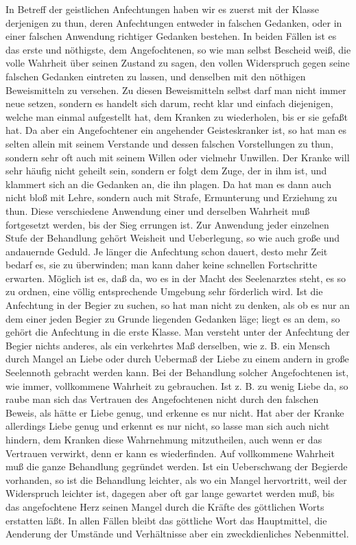 In Betreff der geistlichen Anfechtungen haben wir es zuerst mit der Klasse derjenigen zu thun, deren Anfechtungen entweder in falschen Gedanken, oder in einer falschen Anwendung richtiger Gedanken bestehen. In beiden Fällen ist es das erste und nöthigste, dem Angefochtenen, so wie man selbst Bescheid weiß, die volle Wahrheit über seinen Zustand zu sagen, den vollen Widerspruch gegen seine falschen Gedanken eintreten zu lassen, und denselben mit den nöthigen Beweismitteln zu versehen. Zu diesen Beweismitteln selbst darf man nicht immer neue setzen, sondern es handelt sich darum, recht klar und einfach diejenigen, welche man einmal aufgestellt hat, dem Kranken zu wiederholen, bis er sie gefaßt hat. Da
aber ein Angefochtener ein angehender Geisteskranker ist, so hat man es selten allein mit seinem Verstande und dessen falschen Vorstellungen zu thun, sondern sehr oft auch mit seinem Willen oder vielmehr Unwillen. Der Kranke will sehr häufig nicht geheilt sein, sondern er folgt dem Zuge, der in ihm ist, und klammert sich an die Gedanken an, die ihn plagen. Da hat man es dann auch nicht bloß mit Lehre, sondern auch mit Strafe, Ermunterung und Erziehung zu thun. Diese verschiedene Anwendung einer und derselben Wahrheit muß fortgesetzt werden, bis der Sieg errungen ist. Zur Anwendung jeder einzelnen Stufe der Behandlung gehört Weisheit und Ueberlegung, so wie auch große und andauernde Geduld. Je länger die Anfechtung schon dauert, desto mehr Zeit bedarf es, sie zu überwinden; man kann daher keine schnellen Fortschritte erwarten. Möglich ist es, daß da, wo es in der Macht des Seelenarztes steht, es so zu ordnen, eine völlig entsprechende Umgebung sehr förderlich wird. Ist die Anfechtung in der Begier zu suchen, so hat man nicht zu denken, als ob es nur an dem einer jeden Begier zu Grunde liegenden Gedanken läge; liegt es an dem, so gehört die Anfechtung in die erste Klasse. Man versteht unter der Anfechtung der Begier nichts anderes, als ein verkehrtes Maß derselben, wie z. B. ein Mensch durch Mangel an Liebe oder durch Uebermaß der Liebe zu einem andern in große Seelennoth gebracht werden kann. Bei der Behandlung solcher Angefochtenen ist, wie immer, vollkommene Wahrheit zu gebrauchen. Ist z. B. zu wenig Liebe da, so raube man sich das Vertrauen des Angefochtenen nicht durch den falschen Beweis, als hätte er Liebe
genug, und erkenne es nur nicht. Hat aber der Kranke allerdings Liebe genug und erkennt es nur nicht, so lasse man sich auch nicht hindern, dem Kranken diese Wahrnehmung mitzutheilen, auch wenn er das Vertrauen verwirkt, denn er kann es wiederfinden. Auf vollkommene Wahrheit muß die ganze Behandlung gegründet werden. Ist ein Ueberschwang der Begierde vorhanden, so ist die Behandlung leichter, als wo ein Mangel hervortritt, weil der Widerspruch leichter ist, dagegen aber oft gar lange gewartet werden muß, bis das angefochtene Herz seinen Mangel durch die Kräfte des göttlichen Worts erstatten läßt. In allen Fällen bleibt das göttliche Wort das Hauptmittel, die Aenderung der Umstände und Verhältnisse aber ein zweckdienliches Nebenmittel.

